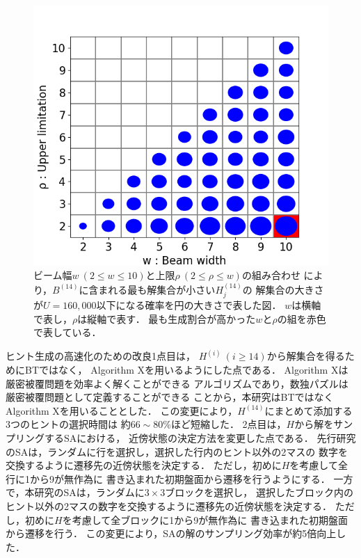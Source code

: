 \documentclass[a4paper, 9pt]{jarticle}
\begin{document}
\begin{論文概要}
\begin{figure}[bt]
  \centering
  \includegraphics[keepaspectratio, scale=0.4]{best_beam_width_and_rho.png}
  \caption{ビーム幅$w~(2 \leq w \leq 10)$と上限$\rho~(2 \leq \rho \leq w)$の組み合わせ
  により，$B^{(14)}$に含まれる最も解集合が小さい$H^{(14)}_j$の
  解集合の大きさが$U = 160,000$以下になる確率を円の大きさで表した図．
  $w$は横軸で表し，$\rho$は縦軸で表す．
  最も生成割合が高かった$w$と$\rho$の組を赤色で表している．} 
  \label{fig:best_beam_width_and_rho}
\end{figure}
ヒント生成の高速化のための改良1点目は，
$H^{(i)} ~ (i \geq 14)$から解集合を得るためにBTではなく，
Algorithm Xを用いるようにした点である．
Algorithm Xは厳密被覆問題を効率よく解くことができる
アルゴリズムであり，数独パズルは厳密被覆問題として定義することができる
ことから，本研究はBTではなくAlgorithm Xを用いることとした．
この変更により，$H^{(14)}$にまとめて添加する3つのヒントの選択時間は
約$66 \sim 80$\%ほど短縮した．
2点目は，$H$から解をサンプリングするSAにおける，
近傍状態の決定方法を変更した点である．
先行研究のSAは，ランダムに行を選択し，選択した行内のヒント以外の2マスの
数字を交換するように遷移先の近傍状態を決定する．
ただし，初めに$H$を考慮して全行に1から9が無作為に
書き込まれた初期盤面から遷移を行うようにする．
一方で，本研究のSAは，ランダムに$3 \times 3$ブロックを選択し，
選択したブロック内のヒント以外の2マスの数字を交換するように遷移先の近傍状態を決定する．
ただし，初めに$H$を考慮して全ブロックに1から9が無作為に
書き込まれた初期盤面から遷移を行う．
この変更により，SAの解のサンプリング効率が約5倍向上した．


\end{論文概要}
\end{document}
